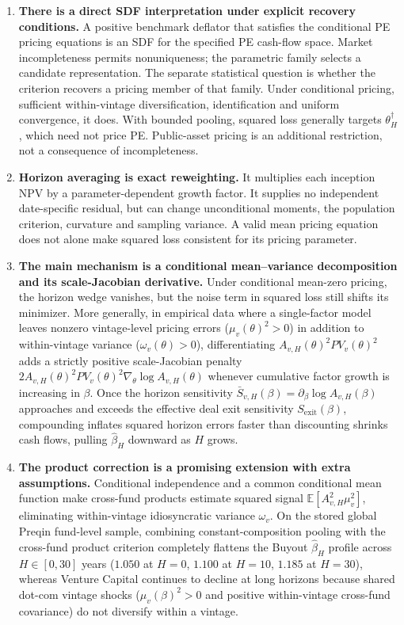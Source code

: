 \documentclass[11pt]{article}
\newcommand{\E}{\mathbb{E}}
\theoremstyle{plain}
\theoremstyle{definition}
\begin{document}
\begin{enumerate}
\item \textbf{There is a direct SDF interpretation under explicit recovery conditions.} A positive benchmark deflator that satisfies the conditional PE pricing equations is an SDF for the specified PE cash-flow space. Market incompleteness permits nonuniqueness; the parametric family selects a candidate representation. The separate statistical question is whether the criterion recovers a pricing member of that family. Under conditional pricing, sufficient within-vintage diversification, identification and uniform convergence, it does. With bounded pooling, squared loss generally targets $\theta_H^\dagger$, which need not price PE. Public-asset pricing is an additional restriction, not a consequence of incompleteness.
\item \textbf{Horizon averaging is exact reweighting.} It multiplies each inception NPV by a parameter-dependent growth factor. It supplies no independent date-specific residual, but can change unconditional moments, the population criterion, curvature and sampling variance. A valid mean pricing equation does not alone make squared loss consistent for its pricing parameter.
\item \textbf{The main mechanism is a conditional mean--variance decomposition and its scale-Jacobian derivative.} Under conditional mean-zero pricing, the horizon wedge vanishes, but the noise term in squared loss still shifts its minimizer. More generally, in empirical data where a single-factor model leaves nonzero vintage-level pricing errors ($\mu_v(\theta)^2>0$) in addition to within-vintage variance ($\omega_v(\theta)>0$), differentiating $A_{v,H}(\theta)^2 PV_v(\theta)^2$ adds a strictly positive scale-Jacobian penalty $2A_{v,H}(\theta)^2 PV_v(\theta)^2 \nabla_\theta\log A_{v,H}(\theta)$ whenever cumulative factor growth is increasing in $\beta$. Once the horizon sensitivity $\bar S_{v,H}(\beta)=\partial_\beta\log A_{v,H}(\beta)$ approaches and exceeds the effective deal exit sensitivity $S_{\mathrm{exit}}(\beta)$, compounding inflates squared horizon errors faster than discounting shrinks cash flows, pulling $\hat\beta_H$ downward as $H$ grows.
\item \textbf{The product correction is a promising extension with extra assumptions.} Conditional independence and a common conditional mean function make cross-fund products estimate squared signal $\E[A_{v,H}^2\mu_v^2]$, eliminating within-vintage idiosyncratic variance $\omega_v$. On the stored global Preqin fund-level sample, combining constant-composition pooling with the cross-fund product criterion completely flattens the Buyout $\hat\beta_H$ profile across $H\in[0,30]$ years ($1.050$ at $H=0$, $1.100$ at $H=10$, $1.185$ at $H=30$), whereas Venture Capital continues to decline at long horizons because shared dot-com vintage shocks ($\mu_v(\beta)^2>0$ and positive within-vintage cross-fund covariance) do not diversify within a vintage.

\end{enumerate}
\end{document}
